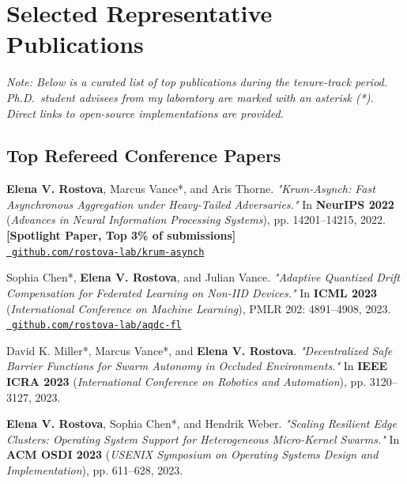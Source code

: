 \documentclass[11pt, a4paper, parskip=half]{scrartcl}
\begin{document}
\section{Selected Representative Publications}

\textit{Note: Below is a curated list of top publications during the tenure-track period. Ph.D.\ student advisees from my laboratory are marked with an asterisk (*). Direct links to open-source implementations are provided.}

\subsection{Top Refereed Conference Papers}

\begin{enumerate}[label={\sffamily\bfseries [C\arabic*]}]
  \item \textbf{Elena V. Rostova}, Marcus Vance*, and Aris Thorne. \textit{"Krum-Asynch: Fast Asynchronous Aggregation under Heavy-Tailed Adversaries."} In \textbf{NeurIPS 2022} (\textit{Advances in Neural Information Processing Systems}), pp. 14201--14215, 2022. \textcolor{SecondaryTeal}{\textbf{[Spotlight Paper, Top 3\% of submissions]}} \\
  \small\href{https://github.com/rostova-lab/krum-asynch}{\faCodeBranch \ \texttt{github.com/rostova-lab/krum-asynch}}

  \item Sophia Chen*, \textbf{Elena V. Rostova}, and Julian Vance. \textit{"Adaptive Quantized Drift Compensation for Federated Learning on Non-IID Devices."} In \textbf{ICML 2023} (\textit{International Conference on Machine Learning}), PMLR 202: 4891--4908, 2023. \\
  \small\href{https://github.com/rostova-lab/aqdc-fl}{\faCodeBranch \ \texttt{github.com/rostova-lab/aqdc-fl}}

  \item David K. Miller*, Marcus Vance*, and \textbf{Elena V. Rostova}. \textit{"Decentralized Safe Barrier Functions for Swarm Autonomy in Occluded Environments."} In \textbf{IEEE ICRA 2023} (\textit{International Conference on Robotics and Automation}), pp. 3120--3127, 2023.

  \item \textbf{Elena V. Rostova}, Sophia Chen*, and Hendrik Weber. \textit{"Scaling Resilient Edge Clusters: Operating System Support for Heterogeneous Micro-Kernel Swarms."} In \textbf{ACM OSDI 2023} (\textit{USENIX Symposium on Operating Systems Design and Implementation}), pp. 611--628, 2023.


\end{enumerate}
\end{document}
